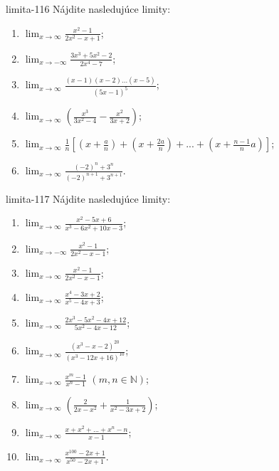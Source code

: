 \begin{defproblem}{limita-116}
Nájdite nasledujúce limity:

\begin{multicols}{2}
\begin{enumerate}
    \item $\lim_{{x \rightarrow \infty}} \frac{x^2-1}{2x^2-x+1}$;
    \item $\lim_{{x \rightarrow -\infty}} \frac{3x^3+5x^2-2}{2x^4-7}$;
    \item $\lim_{{x \rightarrow \infty}} \frac{(x-1)(x-2)...(x-5)}{(5x-1)^5}$;
    \item $\lim_{{x \rightarrow \infty}} (\frac{x^3}{3x^2-4}-\frac{x^2}{3x+2})$;
    \item $\lim_{{x \rightarrow \infty}} \frac{1}{n}[(x+\frac{a}{n})+(x+\frac{2a}{n})+...+(x+\frac{n-1}{n}a)]$;
    \item $\lim_{{x \rightarrow \infty}} \frac{(-2)^n+3^n}{(-2)^{n+1}+3^{n+1}}$.
\end{enumerate}
\end{multicols}
\end{defproblem}

\begin{defproblem}{limita-117}
Nájdite nasledujúce limity:

\begin{multicols}{2}
\begin{enumerate}
    \item $\lim_{{x \rightarrow \infty}} \frac{x^2-5x+6}{x^3-6x^2+10x-3}$;
    \item $\lim_{{x \rightarrow -\infty}} \frac{x^2-1}{2x^2-x-1}$;
    \item $\lim_{{x \rightarrow \infty}} \frac{x^2-1}{2x^2-x-1}$;
    \item $\lim_{{x \rightarrow \infty}} \frac{x^4-3x+2}{x^5-4x+3}$;
    \item $\lim_{{x \rightarrow \infty}} \frac{2x^3-5x^2-4x+12}{5x^2-4x-12}$;
    \item $\lim_{{x \rightarrow \infty}} \frac{(x^3-x-2)^{20}}{(x^3-12x+16)^{10}}$;
    \item $\lim_{{x \rightarrow \infty}} \frac{x^m-1}{x^n-1}$ $(m,n \in \mathbb{N})$;
    \item $\lim_{{x \rightarrow \infty}} (\frac{2}{2x-x^2}+\frac{1}{x^2-3x+2})$;
    \item $\lim_{{x \rightarrow \infty}} \frac{x+x^2+...+x^n-n}{x-1}$;
    \item $\lim_{{x \rightarrow \infty}} \frac{x^{100}-2x+1}{x^{50}-2x+1}$.
\end{enumerate}
\end{multicols}
\end{defproblem}

